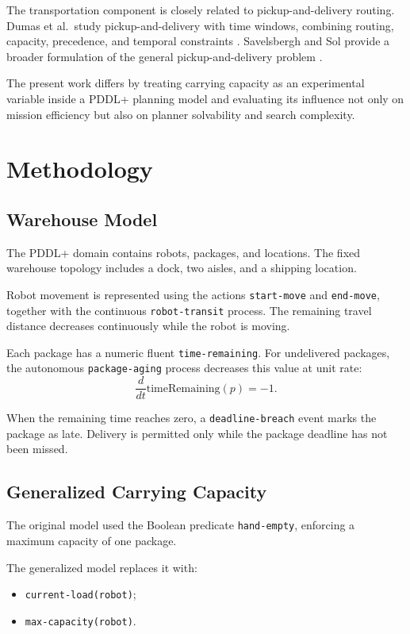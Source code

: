 \documentclass[conference]{IEEEtran}
\begin{document}
The transportation component is closely related to pickup-and-delivery
routing. Dumas et al.\ study pickup-and-delivery with time windows, combining
routing, capacity, precedence, and temporal constraints \cite{dumas1991}.
Savelsbergh and Sol provide a broader formulation of the general
pickup-and-delivery problem \cite{savelsbergh1995}.

The present work differs by treating carrying capacity as an experimental
variable inside a PDDL+ planning model and evaluating its influence not only on
mission efficiency but also on planner solvability and search complexity.

\section{Methodology}

\subsection{Warehouse Model}

The PDDL+ domain contains robots, packages, and locations. The fixed warehouse
topology includes a dock, two aisles, and a shipping location.

Robot movement is represented using the actions \texttt{start-move} and
\texttt{end-move}, together with the continuous \texttt{robot-transit}
process. The remaining travel distance decreases continuously while the robot
is moving.

Each package has a numeric fluent
\texttt{time-remaining}. For undelivered packages, the autonomous
\texttt{package-aging} process decreases this value at unit rate:
\begin{equation}
\frac{d}{dt}\mathrm{timeRemaining}(p)=-1.
\end{equation}

When the remaining time reaches zero, a \texttt{deadline-breach} event marks
the package as late. Delivery is permitted only while the package deadline has
not been missed.

\subsection{Generalized Carrying Capacity}

The original model used the Boolean predicate \texttt{hand-empty}, enforcing a
maximum capacity of one package.

The generalized model replaces it with:
\begin{itemize}
    \item \texttt{current-load(robot)};
    \item \texttt{max-capacity(robot)}.
\end{itemize}
\end{document}
